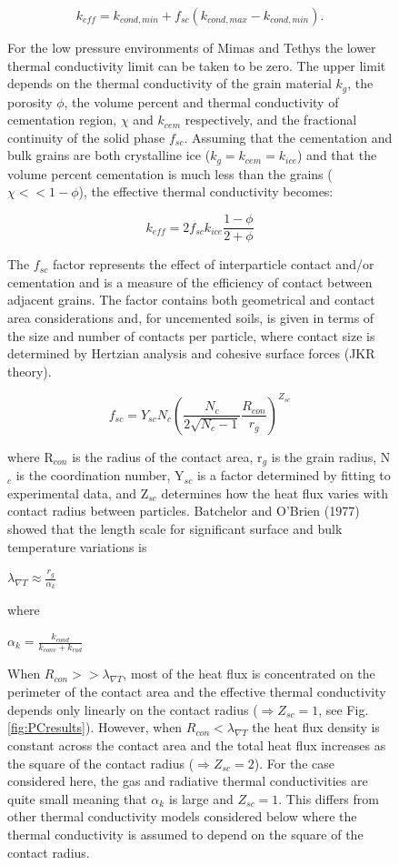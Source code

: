 \documentclass[11pt]{article} %
\begin{document}
\begin{figure}[ht]
	\begin{equation}
	k_{eff} = k_{cond,min} +f_{sc}(k_{cond,max}-k_{cond,min}).
	\end{equation}
	
	For the low pressure environments of Mimas and Tethys the lower thermal conductivity limit can be taken to be zero. The upper limit depends on the thermal conductivity of the grain material $ k_{g}$, the porosity $\phi$, the volume percent and thermal conductivity of cementation region, $\chi$ and $k_{cem}$ respectively, and the fractional continuity of the solid phase $f_{sc}$. Assuming that the cementation and bulk grains are both crystalline ice ($k_{g} = k_{cem} = k_{ice}$) and that the volume percent cementation is much less than the grains ($\chi << 1-\phi$), the effective thermal conductivity becomes:	
	
	\begin{equation}
	k_{eff}=2 f_{sc} k_{ice} \frac{1-\phi}{2+\phi}
	\end{equation}
	
	The $f_{sc}$ factor represents the effect of interparticle contact and/or cementation and is a measure of the efficiency of contact between adjacent grains. The factor contains both geometrical and contact area considerations and, for uncemented soils, is given in terms of the size and number of contacts per particle, where contact size is determined by Hertzian analysis and cohesive surface forces (JKR theory).
	
	\begin{equation}
	f_{sc} = Y_{sc}N_{c} \left( \frac{N_{c}}{2\sqrt{N_{c}-1}} \frac{R_{con}}{r_{g}} \right)^{Z_{sc}}
	\end{equation}
	
	where R$_{con}$ is the radius of the contact area, r$_{g}$ is the grain radius, N$_{c}$ is the coordination number, Y$_{sc}$ is a factor determined by fitting to experimental data, and Z$_{sc}$ determines how the heat flux varies with contact radius between particles. Batchelor and O'Brien (1977) showed that the length scale for significant surface and bulk temperature variations is 
	
	$\lambda_{\nabla T} \approx \frac{r_{g}}{\alpha_{k}}$ 
	
	where 
	
	$\alpha_{k}=\frac{k_{cond}}{k_{conv}+k_{rad}}$
	
	When $R_{con} >> \lambda_{\nabla T}$, most of the heat flux is concentrated on the perimeter of the contact area and the effective thermal conductivity depends only linearly on the contact radius ($\Rightarrow Z_{sc} = 1$, see Fig.\ref{fig:PCresults}). However, when $R_{con}<\lambda_{\nabla T}$ the heat flux density is constant across the contact area and the total heat flux increases as the square of the contact radius ($\Rightarrow Z_{sc} = 2$). For the case considered here, the gas and radiative thermal conductivities are quite small meaning that $\alpha_{k}$ is large and $Z_{sc} = 1$. This differs from other thermal conductivity models considered below where the thermal conductivity is assumed to depend on the square of the contact radius. 
	

\end{figure}
\end{document}
